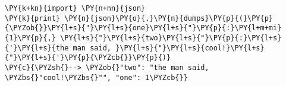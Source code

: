 \begin{Verbatim}[commandchars=\\\{\}]
\PY{k+kn}{import} \PY{n+nn}{json}
\PY{k}{print} \PY{n}{json}\PY{o}{.}\PY{n}{dumps}\PY{p}{(}\PY{p}{\PYZob{}}\PY{l+s}{"}\PY{l+s}{one}\PY{l+s}{"}\PY{p}{:}\PY{l+m+mi}{1}\PY{p}{,} \PY{l+s}{"}\PY{l+s}{two}\PY{l+s}{"}\PY{p}{:}\PY{l+s}{'}\PY{l+s}{the man said, }\PY{l+s}{"}\PY{l+s}{cool!}\PY{l+s}{"}\PY{l+s}{'}\PY{p}{\PYZcb{}}\PY{p}{)}
\PY{c}{\PYZsh{}--> \PYZob{}"two": "the man said, \PYZbs{}"cool!\PYZbs{}"", "one": 1\PYZcb{}}
\end{Verbatim}

